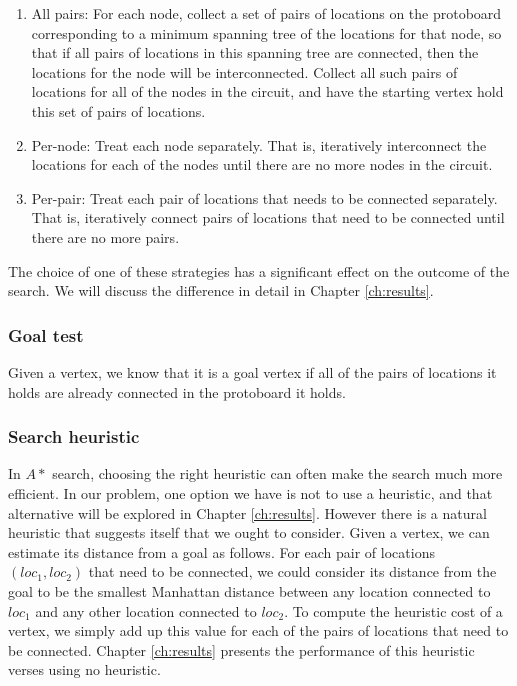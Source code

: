 \begin{enumerate}
\item All pairs: For each node, collect a set of pairs of locations on the
protoboard
corresponding to a minimum spanning tree of the locations for that node, so that
if all pairs of locations in this spanning tree are connected, then the
locations for the node will be interconnected. Collect all such pairs of
locations for all of the nodes in the circuit, and have the starting vertex hold
this set of pairs of locations.
\item Per-node: Treat each node separately. That is, iteratively interconnect the
locations for each of the nodes until there are no more nodes in the circuit.
\item Per-pair: Treat each pair of locations that needs to be connected
separately. That
is, iteratively connect pairs of locations that need to be connected until there
are no more pairs.
\end{enumerate}

The choice of one of these strategies has a significant effect on the outcome of
the search. We will discuss the difference in detail in Chapter
\ref{ch:results}.

\subsubsection{Goal test}

Given a vertex, we know that it is a goal vertex if all of the pairs of
locations it holds are already connected in the protoboard it holds.

\subsubsection{Search heuristic}

In $A*$ search, choosing the right heuristic can often make the search much more
efficient. In our problem, one option we have is not to use a heuristic, and
that alternative will be explored in Chapter \ref{ch:results}. However there is
a natural heuristic that suggests itself that we ought to consider. Given a
vertex, we can estimate its distance from a goal as follows. For each pair of
locations $(loc_1, loc_2)$ that need to be connected, we could consider its
distance from the
goal to be the smallest Manhattan distance between any location connected to
$loc_1$ and any other location connected to $loc_2$. To compute the heuristic
cost of a vertex, we simply add up this value for each of the pairs of locations
that need to be connected. Chapter \ref{ch:results} presents the performance of
this heuristic verses using no heuristic.

